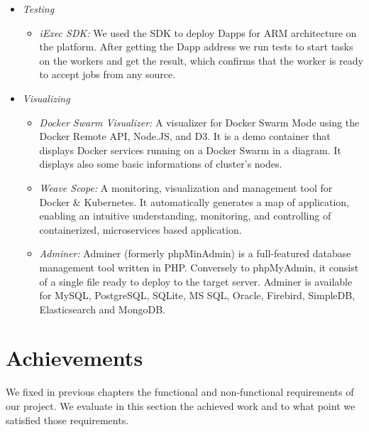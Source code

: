 \begin{itemize}
        \item \textit{Testing}
            \begin{itemize}
                \item \textit{iExec SDK: }
                We used the SDK to deploy Dapps for ARM architecture on the platform. After getting the Dapp
                address we run tests to start tasks on the workers and get the result, which confirms that the
                worker is ready to accept jobs from any source.
            \end{itemize}

        \item \textit{Visualizing}
            \begin{itemize}
                \item \textit{Docker Swarm Visualizer: }
                A visualizer for Docker Swarm Mode using the Docker Remote API, Node.JS, and D3. It is a demo container
                that displays Docker services running on a Docker Swarm in a diagram. It displays also some basic
                informations of cluster's nodes.
                \item \textit{Weave Scope: }
                A monitoring, visualization and management tool for Docker \& Kubernetes. It automatically generates
                a map of application, enabling an intuitive understanding, monitoring, and controlling of containerized,
                microservices based application.
                \item \textit{Adminer: }            
                Adminer (formerly phpMinAdmin) is a full-featured database management tool written in PHP.
                Conversely to phpMyAdmin, it consist of a single file ready to deploy to the target server.
                Adminer is available for MySQL, PostgreSQL, SQLite, MS SQL, Oracle, Firebird, SimpleDB, Elasticsearch
                and MongoDB.
            \end{itemize}

    \end{itemize}

\section{Achievements}
    We fixed in previous chapters the functional and non-functional requirements of our project. We evaluate
    in this section the achieved work and to what point we satisfied those requirements.

